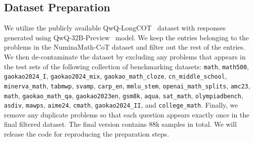 \subsection{Dataset Preparation}\label{sec:app-dataset-curation}
We utilize the publicly available QwQ-LongCOT~\cite{qwq-longcot} dataset with responses generated using QwQ-32B-Preview~\cite{qwq} model.
We keep the entries belonging to the problems in the NuminaMath-CoT dataset \cite{numinamath-cot} and filter out the rest of the entries.
We then de-contaminate the dataset by excluding any problems that appears in the test sets of the following collection of benchmarking datasets: \texttt{math}, \texttt{math500}, \texttt{gaokao2024\_I}, \texttt{gaokao2024\_mix}, \texttt{gaokao\_math\_cloze}, \texttt{cn\_middle\_school}, \texttt{minerva\_math}, \texttt{tabmwp}, \texttt{svamp}, \texttt{carp\_en}, \texttt{mmlu\_stem}, \texttt{openai\_math\_splits}, \texttt{amc23}, \texttt{math}, \texttt{gaokao\_math\_qa}, \texttt{gaokao2023en}, \texttt{gsm8k}, \texttt{aqua}, \texttt{sat\_math}, \texttt{olympiadbench}, \texttt{asdiv}, \texttt{mawps}, \texttt{aime24}, \texttt{cmath}, \texttt{gaokao2024\_II}, and \texttt{college\_math}. 
Finally, we remove any duplicate problems so that each question appears exactly once in the final filtered dataset.
The final version contains 88k samples in total.
We will release the code for reproducing the preparation steps.




